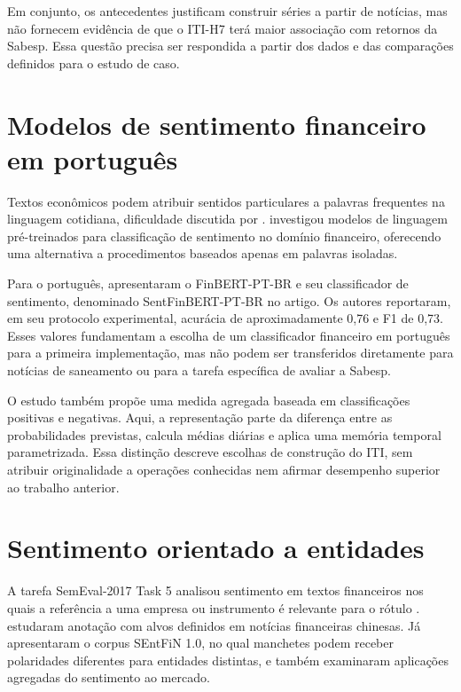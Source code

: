 Em conjunto, os antecedentes justificam construir séries a partir de notícias, mas não fornecem evidência de que o ITI-H7 terá maior associação com retornos da Sabesp. Essa questão precisa ser respondida a partir dos dados e das comparações definidos para o estudo de caso.

\section{Modelos de sentimento financeiro em português}

Textos econômicos podem atribuir sentidos particulares a palavras frequentes na linguagem cotidiana, dificuldade discutida por .  investigou modelos de linguagem pré-treinados para classificação de sentimento no domínio financeiro, oferecendo uma alternativa a procedimentos baseados apenas em palavras isoladas.

Para o português,  apresentaram o FinBERT-PT-BR e seu classificador de sentimento, denominado SentFinBERT-PT-BR no artigo. Os autores reportaram, em seu protocolo experimental, acurácia de aproximadamente 0,76 e F1 de 0,73. Esses valores fundamentam a escolha de um classificador financeiro em português para a primeira implementação, mas não podem ser transferidos diretamente para notícias de saneamento ou para a tarefa específica de avaliar a Sabesp.

O estudo também propõe uma medida agregada baseada em classificações positivas e negativas. Aqui, a representação parte da diferença entre as probabilidades previstas, calcula médias diárias e aplica uma memória temporal parametrizada. Essa distinção descreve escolhas de construção do ITI, sem atribuir originalidade a operações conhecidas nem afirmar desempenho superior ao trabalho anterior.

\section{Sentimento orientado a entidades}

A tarefa SemEval-2017 Task 5 analisou sentimento em textos financeiros nos quais a referência a uma empresa ou instrumento é relevante para o rótulo \cite{cortis2017semeval5}.  estudaram anotação com alvos definidos em notícias financeiras chinesas. Já  apresentaram o corpus SEntFiN 1.0, no qual manchetes podem receber polaridades diferentes para entidades distintas, e também examinaram aplicações agregadas do sentimento ao mercado.

